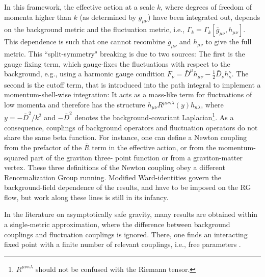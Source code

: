 \documentclass[11pt]{book} %
\begin{document}
In this framework, the effective action at a scale $k$,
where degrees of freedom of momenta higher than $k$ (as determined by $\bar{g}_{\mu \nu}$)
have been integrated out, depends on the background metric and the fluctuation metric,
i.e., $\Gamma_k = \Gamma_k[\bar{g}_{\mu \nu}, h_{\mu \nu}]$.
This dependence is such that one cannot recombine $\bar{g}_{\mu \nu}$
and $h_{\mu \nu}$ to give the full metric.
This ``split-symmetry" breaking is due to two sources:
The first is the gauge fixing term, which gauge-fixes the fluctuations with respect to the background,
e.g., using a harmonic gauge condition
$F_{\nu}=\bar{D}^{\mu}h_{\mu \nu} -\frac{1}{2} \bar{D}_{\nu}h^{\kappa}_{\kappa}$.
The second is the cutoff term, that is introduced into the path integral to implement
a momentum-shell-wise integration: It acts as a mass-like term for fluctuations of low momenta and
therefore has the structure $h_{\mu \nu} R^{\mu \nu \kappa \lambda} (y) h_{\kappa \lambda}$,
where $y=-\bar{D}^2/k^2$ and $-\bar{D}^2$ denotes the background-covariant
Laplacian\footnote{$R^{\mu \nu \kappa \lambda}$ should not be confused with the
Riemann tensor.}.
As a consequence, couplings of background operators and fluctuation operators do not share the same
beta function. For instance, one can define a Newton coupling from the prefactor of the $\bar{R}$ term
in the effective action, or from the momentum-squared part of the graviton three- point function or
from a graviton-matter vertex.
These three definitions of the Newton coupling obey a different Renormalization Group running.
Modified Ward-identities govern the background-field dependence of the results,
and have to be imposed on the RG flow, but work along these lines is still in its infancy.

In the literature on asymptotically safe gravity, many results are obtained within a
single-metric approximation, where the difference between background couplings and fluctuation couplings
is ignored. There, one finds an interacting fixed point with a finite number of relevant couplings,
i.e., free parameters
\cite{
  Reuter:1996cp, Dou:1997fg, Reuter:2001ag, Lauscher:2001ya, Lauscher:2002sq, Litim:2003vp,
  Fischer:2006fz, Machado:2007ea, Eichhorn:2009ah, Codello:2006in, Codello:2008vh,
  Benedetti:2009rx, Eichhorn:2010tb, Groh:2010ta, Manrique:2011jc, Rechenberger:2012dt, Benedetti:2012dx,
  Dietz:2012ic, Falls:2013bv, Benedetti:2013jk, Ohta:2013uca, Demmel:2014sga, Falls:2014tra, Falls:2015qga,
  Falls:2015cta, Gies:2015tca, Demmel:2015oqa}.
\end{document}

